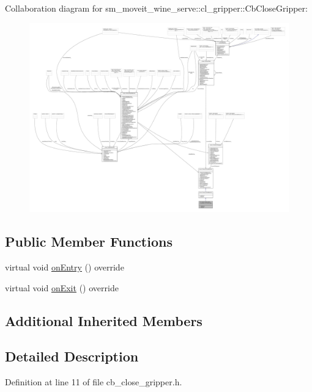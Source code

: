 Collaboration diagram for sm\+\_\+moveit\+\_\+wine\+\_\+serve\+:\+:cl\+\_\+gripper\+:\+:Cb\+Close\+Gripper\+:
\nopagebreak
\begin{figure}[H]
\begin{center}
\leavevmode
\includegraphics[width=350pt]{classsm__moveit__wine__serve_1_1cl__gripper_1_1CbCloseGripper__coll__graph}
\end{center}
\end{figure}
\subsection*{Public Member Functions}
\begin{DoxyCompactItemize}
\item 
virtual void \hyperlink{classsm__moveit__wine__serve_1_1cl__gripper_1_1CbCloseGripper_a0b85c3b5f4fe003bec086fa6969bb075}{on\+Entry} () override
\item 
virtual void \hyperlink{classsm__moveit__wine__serve_1_1cl__gripper_1_1CbCloseGripper_a50bd64b8d7ca34cd223404b54fc1aa3f}{on\+Exit} () override
\end{DoxyCompactItemize}
\subsection*{Additional Inherited Members}


\subsection{Detailed Description}


Definition at line 11 of file cb\+\_\+close\+\_\+gripper.\+h.



